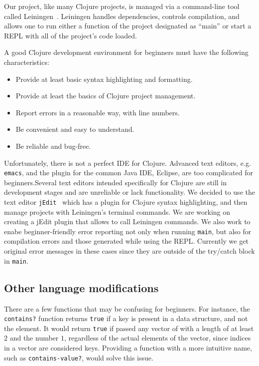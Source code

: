 \documentclass[submission,copyright,creativecommons]{eptcs}
\newcommand{\allcomments}[1]{{#1}}
\newcommand{\elenacomment}[1]{{\bf \textcolor{ForestGreen}{\allcomments{{#1}}}}}
\newcommand{\stephencomment}[1]{{\bf \color{StephensBlue}{\allcomments{{#1}}}}} %
\begin{document}
Our project, like many Clojure projects, is managed via a command-line tool called Leiningen~\cite{lein}. Leiningen handles dependencies, controls compilation, and allows one to run either a function of the project designated as ``main'' or start a REPL with all of the project's code loaded. 

A good Clojure development environment for beginners %
 must have the following characteristics: 
\begin{itemize}
\item Provide at least basic syntax highlighting and formatting. 
\item Provide at least the basics of Clojure project management. 
\item Report errors in a reasonable way, with line numbers. 
\item Be convenient and easy to understand. 
\item Be reliable and bug-free.
\end{itemize}
Unfortunately, there is not a perfect IDE for Clojure. 
Advanced text editors, e.g. {\tt emacs}, and the plugin for the common Java IDE, Eclipse, are too complicated for beginners.Several text editors intended specifically for Clojure are still in development stages and are unreliable or lack functionality. We decided to use the text editor {\tt jEdit}~\cite{jedit} which has a plugin for Clojure syntax highlighting, and then manage projects with Leiningen's terminal commands.  We are working on creating a jEdit plugin that allows to call Leiningen commands. We also work to enabe beginner-friendly error reporting not only when running {\tt main}, but also for compilation errors and those generated while using the REPL. Currently we get original error messages in these  cases since they are outside of the try/catch block in {\tt main}. 

\subsection{Other language modifications}\label{subsec:other}
There are a few functions that may be confusing
 for beginners. For instance, the {\tt contains?} function returns {\tt true} if a key is present in a data structure, and not the element. It would return {\tt true} if passed any vector of with a length of at least $2$ and the number $1$, regardless of the actual elements of the vector, since indices in a vector are considered keys. Providing a function with a more intuitive name, such as {\tt contains-value?}, would solve this issue. %
\end{document}
